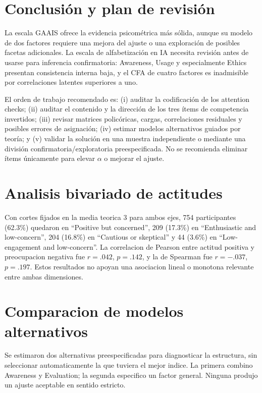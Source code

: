 \documentclass[11pt,a4paper]{article}
\begin{document}
\section{Conclusión y plan de revisión}

La escala GAAIS ofrece la evidencia psicométrica más sólida, aunque su modelo de dos factores requiere una mejora del ajuste o una exploración de posibles facetas adicionales. La escala de alfabetización en IA necesita revisión antes de usarse para inferencia confirmatoria: Awareness, Usage y especialmente Ethics presentan consistencia interna baja, y el CFA de cuatro factores es inadmisible por correlaciones latentes superiores a uno.

El orden de trabajo recomendado es: (i) auditar la codificación de los attention checks; (ii) auditar el contenido y la dirección de los tres ítems de competencia invertidos; (iii) revisar matrices policóricas, cargas, correlaciones residuales y posibles errores de asignación; (iv) estimar modelos alternativos guiados por teoría; y (v) validar la solución en una muestra independiente o mediante una división confirmatoria/exploratoria preespecificada. No se recomienda eliminar ítems únicamente para elevar $\alpha$ o mejorar el ajuste.

\section{Analisis bivariado de actitudes}

Con cortes fijados en la media teorica 3 para ambos ejes, 754 participantes (62.3\%) quedaron en ``Positive but concerned'', 209 (17.3\%) en ``Enthusiastic and low-concern'', 204 (16.8\%) en ``Cautious or skeptical'' y 44 (3.6\%) en ``Low-engagement and low-concern''. La correlacion de Pearson entre actitud positiva y preocupacion negativa fue $r=.042$, $p=.142$, y la de Spearman fue $r=-.037$, $p=.197$. Estos resultados no apoyan una asociacion lineal o monotona relevante entre ambas dimensiones.

\section{Comparacion de modelos alternativos}

Se estimaron dos alternativas preespecificadas para diagnosticar la estructura, sin seleccionar automaticamente la que tuviera el mejor indice. La primera combino Awareness y Evaluation; la segunda especifico un factor general. Ninguna produjo un ajuste aceptable en sentido estricto.
\end{document}
